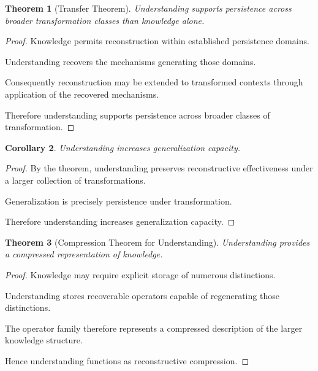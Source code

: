 \documentclass[12pt,oneside]{article}
\newtheorem{theorem}{Theorem}[section] \newtheorem{lemma}[theorem]{Lemma} \newtheorem{proposition}[theorem]{Proposition} \newtheorem{corollary}[theorem]{Corollary}
\theoremstyle{definition}
\begin{document}
\begin{theorem}[Transfer Theorem]

Understanding supports persistence across broader transformation classes than knowledge alone.

\end{theorem}

\begin{proof}

Knowledge permits reconstruction within established persistence domains.

Understanding recovers the mechanisms generating those domains.

Consequently reconstruction may be extended to transformed contexts through application of the recovered mechanisms.

Therefore understanding supports persistence across broader classes of transformation.

\end{proof}

\begin{corollary}

Understanding increases generalization capacity.

\end{corollary}

\begin{proof}

By the theorem, understanding preserves reconstructive effectiveness under a larger collection of transformations.

Generalization is precisely persistence under transformation.

Therefore understanding increases generalization capacity.

\end{proof}

\begin{theorem}[Compression Theorem for Understanding]

Understanding provides a compressed representation of knowledge.

\end{theorem}

\begin{proof}

Knowledge may require explicit storage of numerous distinctions.

Understanding stores recoverable operators capable of regenerating those distinctions.

The operator family therefore represents a compressed description of the larger knowledge structure.

Hence understanding functions as reconstructive compression.

\end{proof}
\end{document}
